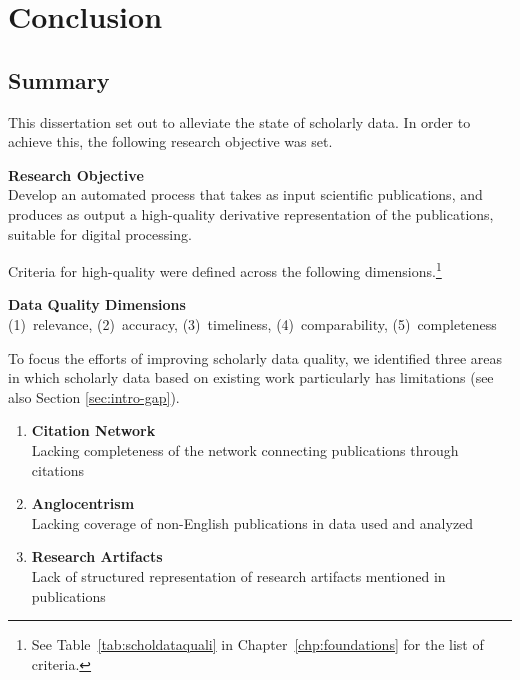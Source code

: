 \chapter{Conclusion}
\label{chp:conclusion}

\section{Summary}

This dissertation set out to alleviate the state of scholarly data. In order to achieve this, the following research objective was set.

\begin{infobox-objective}
\textbf{Research Objective}\\
Develop an automated process that takes as input scientific publications, and produces as output a high-quality derivative representation of the publications, suitable for digital processing.
\end{infobox-objective}

Criteria for high-quality were defined across the following dimensions.\footnote{See Table~\ref{tab:scholdataquali} in Chapter~\ref{chp:foundations} for the list of criteria.}

\begin{infobox-progress}
      \textbf{Data Quality Dimensions}\\
       (1)~relevance, (2)~accuracy, (3)~timeliness, (4)~comparability, (5)~completeness
\end{infobox-progress}

To focus the efforts of improving scholarly data quality, we identified three areas in which scholarly data based on existing work particularly has limitations (see also Section \ref{sec:intro-gap}).

\begin{enumerate}
    \item \textbf{Citation Network}\\
          Lacking completeness of the network connecting publications through citations
    \item \textbf{Anglocentrism}\\
          Lacking coverage of non-English publications in data used and analyzed
    \item \textbf{Research Artifacts}\\
           Lack of structured representation of research artifacts mentioned in publications
\end{enumerate}

